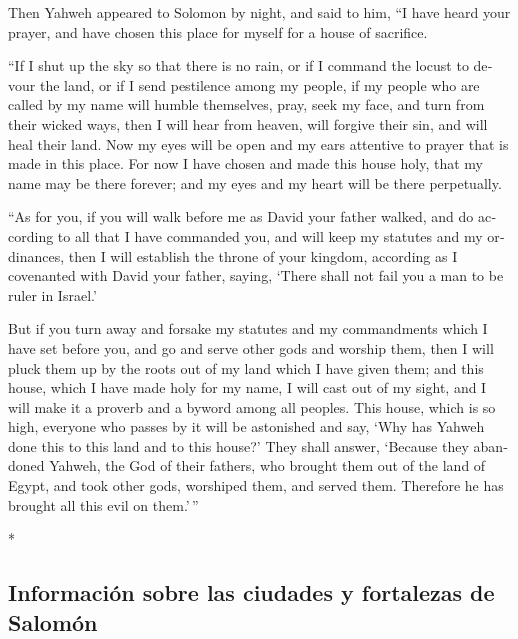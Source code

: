 \begin{paracol}{2}
\begin{otherlanguage}{english}
 Then Yahweh appeared to Solomon by night, and said to
him, ``I have heard your prayer, and have chosen this place for myself
for a house of sacrifice.

 ``If I shut up the sky so that there is no rain, or if I
command the locust to devour the land, or if I send pestilence among my
people,  if my people who are called by my name will
humble themselves, pray, seek my face, and turn from their wicked ways,
then I will hear from heaven, will forgive their sin, and will heal
their land.  Now my eyes will be open and my ears
attentive to prayer that is made in this place.  For now
I have chosen and made this house holy, that my name may be there
forever; and my eyes and my heart will be there perpetually.

 ``As for you, if you will walk before me as David your
father walked, and do according to all that I have commanded you, and
will keep my statutes and my ordinances,  then I will
establish the throne of your kingdom, according as I covenanted with
David your father, saying, `There shall not fail you a man to be ruler
in Israel.'

 But if you turn away and forsake my statutes and my
commandments which I have set before you, and go and serve other gods
and worship them,  then I will pluck them up by the roots
out of my land which I have given them; and this house, which I have
made holy for my name, I will cast out of my sight, and I will make it a
proverb and a byword among all peoples.  This house,
which is so high, everyone who passes by it will be astonished and say,
`Why has Yahweh done this to this land and to this house?'
 They shall answer, `Because they abandoned Yahweh, the
God of their fathers, who brought them out of the land of Egypt, and
took other gods, worshiped them, and served them. Therefore he has
brought all this evil on them.'\,''

\end{otherlanguage}

\switchcolumn[0]*

\hypertarget{informaciuxf3n-sobre-las-ciudades-y-fortalezas-de-salomuxf3n}{%
\subsection{Información sobre las ciudades y fortalezas de
Salomón}\label{informaciuxf3n-sobre-las-ciudades-y-fortalezas-de-salomuxf3n}}


\end{paracol}
